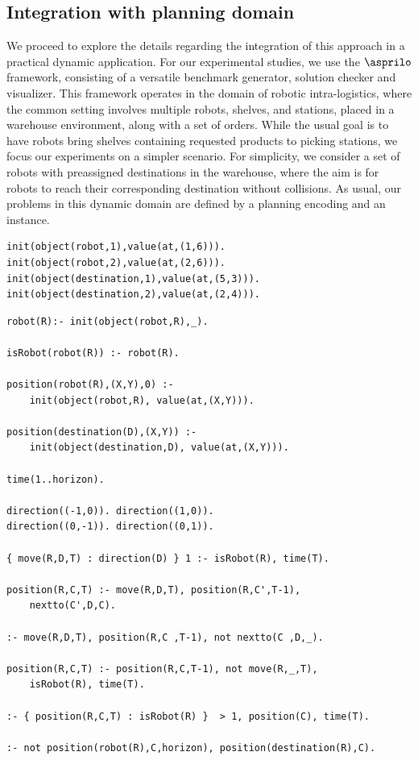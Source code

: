 \subsection{Integration with planning domain  }

We proceed to explore the details regarding the integration of this approach in a practical dynamic application. For our experimental studies, we use the $\asprilo$ \cite{geobotscsangso18a} framework, consisting of a versatile benchmark generator, solution checker and visualizer. This framework operates in the domain of robotic intra-logistics, where the common setting involves multiple robots, shelves, and stations, placed in a warehouse environment, along with a set of orders. While the usual goal is to have robots bring shelves containing requested products to picking stations, we focus our experiments on a simpler scenario. For simplicity, we consider a set of robots with preassigned destinations in the warehouse, where the aim is for robots to reach their corresponding destination without collisions. As usual, our problems in this dynamic domain are defined by a planning encoding and an instance. 

\begin{center}
    \begin{lstlisting}[] 
init(object(robot,1),value(at,(1,6))).
init(object(robot,2),value(at,(2,6))).
init(object(destination,1),value(at,(5,3))).
init(object(destination,2),value(at,(2,4))).
    \end{lstlisting}
\end{center}


\begin{center}
    \begin{lstlisting}[] 
robot(R):- init(object(robot,R),_).

isRobot(robot(R)) :- robot(R).

position(robot(R),(X,Y),0) :- 
    init(object(robot,R), value(at,(X,Y))).

position(destination(D),(X,Y)) :- 
    init(object(destination,D), value(at,(X,Y))).

time(1..horizon).

direction((-1,0)). direction((1,0)). 
direction((0,-1)). direction((0,1)).

{ move(R,D,T) : direction(D) } 1 :- isRobot(R), time(T).

position(R,C,T) :- move(R,D,T), position(R,C',T-1), 
    nextto(C',D,C).

:- move(R,D,T), position(R,C ,T-1), not nextto(C ,D,_).

position(R,C,T) :- position(R,C,T-1), not move(R,_,T),     
    isRobot(R), time(T).

:- { position(R,C,T) : isRobot(R) }  > 1, position(C), time(T).

:- not position(robot(R),C,horizon), position(destination(R),C).
    \end{lstlisting}
\end{center}


